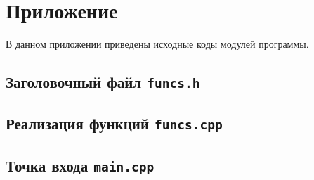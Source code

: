 \documentclass[12pt,a4paper]{article}
\begin{document}
\newpage
\appendix
\section{Приложение}

В данном приложении приведены исходные коды модулей программы.

\subsection{Заголовочный файл \texttt{funcs.h}}


\subsection{Реализация функций \texttt{funcs.cpp}}


\subsection{Точка входа \texttt{main.cpp}}

\end{document}
